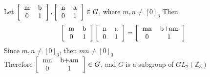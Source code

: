 \documentclass[paper=usletter, fontsize=12pt]{article}
\begin{document}
\begin{itemize}
\begin{itemize}
\begin{cproof}
                Let $\left[\begin{tabular}{cc}
                            m & b \\
                            0 & 1
                    \end{tabular}\right],\left[\begin{tabular}{cc}
                            n & a \\
                            0 & 1
                    \end{tabular}\right] \in G$, where $m,n \neq [0]_3$
                Then
                \begin{align*}
                    \left[\begin{tabular}{cc}
                            m & b \\
                            0 & 1
                    \end{tabular}\right]\left[\begin{tabular}{cc}
                            n & a \\
                            0 & 1
                    \end{tabular}\right] & = \left[\begin{tabular}{cc}
                            mn & b+am \\
                            0 & 1
                    \end{tabular}\right]
                \end{align*}
                Since $m,n \neq [0]_3$, then $mn \neq [0]_3$\\

                Therefore $\left[\begin{tabular}{cc}
                            mn & b+am \\
                            0 & 1
                    \end{tabular}\right] \in G$, and $G$ is a subgroup of
                    $GL_2(\mathbb{Z}_3)$\\


\end{cproof}
\end{itemize}
\end{itemize}
\end{document}
